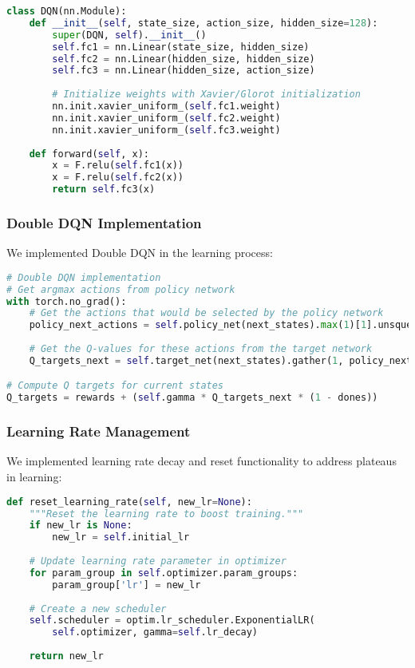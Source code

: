 \documentclass[11pt,a4paper]{article}
\begin{document}
\begin{lstlisting}[language=Python, caption=DQN Network Architecture]
class DQN(nn.Module):
    def __init__(self, state_size, action_size, hidden_size=128):
        super(DQN, self).__init__()
        self.fc1 = nn.Linear(state_size, hidden_size)
        self.fc2 = nn.Linear(hidden_size, hidden_size)
        self.fc3 = nn.Linear(hidden_size, action_size)
        
        # Initialize weights with Xavier/Glorot initialization
        nn.init.xavier_uniform_(self.fc1.weight)
        nn.init.xavier_uniform_(self.fc2.weight)
        nn.init.xavier_uniform_(self.fc3.weight)
    
    def forward(self, x):
        x = F.relu(self.fc1(x))
        x = F.relu(self.fc2(x))
        return self.fc3(x)
\end{lstlisting}

\subsubsection{Double DQN Implementation}
We implemented Double DQN in the learning process:

\begin{lstlisting}[language=Python, caption=Double DQN Implementation]
# Double DQN implementation
# Get argmax actions from policy network
with torch.no_grad():
    # Get the actions that would be selected by the policy network
    policy_next_actions = self.policy_net(next_states).max(1)[1].unsqueeze(1)
    
    # Get the Q-values for these actions from the target network
    Q_targets_next = self.target_net(next_states).gather(1, policy_next_actions)

# Compute Q targets for current states
Q_targets = rewards + (self.gamma * Q_targets_next * (1 - dones))
\end{lstlisting}

\subsubsection{Learning Rate Management}
We implemented learning rate decay and reset functionality to address plateaus in learning:

\begin{lstlisting}[language=Python, caption=Learning Rate Management]
def reset_learning_rate(self, new_lr=None):
    """Reset the learning rate to boost training."""
    if new_lr is None:
        new_lr = self.initial_lr
        
    # Update learning rate parameter in optimizer
    for param_group in self.optimizer.param_groups:
        param_group['lr'] = new_lr
        
    # Create a new scheduler
    self.scheduler = optim.lr_scheduler.ExponentialLR(
        self.optimizer, gamma=self.lr_decay)
    
    return new_lr
\end{lstlisting}
\end{document}
